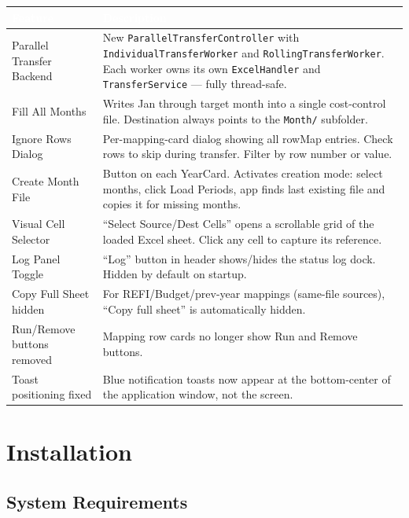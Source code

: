 \documentclass[11pt,a4paper]{article}
\begin{document}
\begin{center}
\begin{tabularx}{0.92\linewidth}{@{} l X @{}}
\toprule
\rowcolor{NewFeature}
\textcolor{White}{\textbf{Feature}} & \textcolor{White}{\textbf{Description}} \\
\midrule
Parallel Transfer Backend & New \texttt{ParallelTransferController} with \texttt{IndividualTransferWorker} and \texttt{RollingTransferWorker}. Each worker owns its own \texttt{ExcelHandler} and \texttt{TransferService} --- fully thread-safe. \\
Fill All Months & Writes Jan through target month into a single cost-control file. Destination always points to the \texttt{Month/} subfolder. \\
Ignore Rows Dialog & Per-mapping-card dialog showing all rowMap entries. Check rows to skip during transfer. Filter by row number or value. \\
Create Month File & Button on each YearCard. Activates creation mode: select months, click Load Periods, app finds last existing file and copies it for missing months. \\
Visual Cell Selector & ``Select Source/Dest Cells'' opens a scrollable grid of the loaded Excel sheet. Click any cell to capture its reference. \\
Log Panel Toggle & ``Log'' button in header shows/hides the status log dock. Hidden by default on startup. \\
Copy Full Sheet hidden & For REFI/Budget/prev-year mappings (same-file sources), ``Copy full sheet'' is automatically hidden. \\
Run/Remove buttons removed & Mapping row cards no longer show Run and Remove buttons. \\
Toast positioning fixed & Blue notification toasts now appear at the bottom-center of the application window, not the screen. \\
\bottomrule
\end{tabularx}
\end{center}

\section{Installation}

\subsection{System Requirements}
\end{document}
